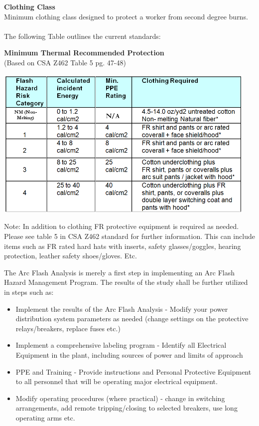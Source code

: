 \textbf{Clothing Class}\\
Minimum clothing class designed to protect a worker from second degree burns.
\\
\\
The following Table outlines the current standards:
\\
\begin{center}

\textbf{Minimum Thermal Recommended Protection}\\
(Based on CSA Z462 Table 5 pg. 47-48)

\includegraphics[width=5in, keepaspectratio=true]{../Images/Clothing.png} \\

\end{center}

\noindent *Note: In addition to clothing FR protective equipment is required as needed. Please see table 5 in CSA Z462 standard for further information. This can include items such as FR rated hard hats with inserts, safety glasses/goggles, hearing protection, leather safety shoes/gloves. Etc.

\pagebreak

\noindent The Arc Flash Analysis is merely a first step in implementing an Arc Flash Hazard Management Program.  The results of the study shall be further utilized in steps such as:\\

\begin{itemize}
\item	Implement the results of the Arc Flash Analysis - Modify your power distribution system parameters as needed (change settings on the protective relays/breakers, replace fuses etc.)
\\
\item	Implement a comprehensive labeling program - Identify all Electrical Equipment in the plant, including sources of power and limits of approach  
\\
\item	PPE and Training - Provide instructions and Personal Protective Equipment to all personnel that will be operating major electrical equipment.
\\
\item	Modify operating procedures (where practical) - change in switching arrangements, add remote tripping/closing to selected breakers, use long operating arms etc.
\end{itemize}